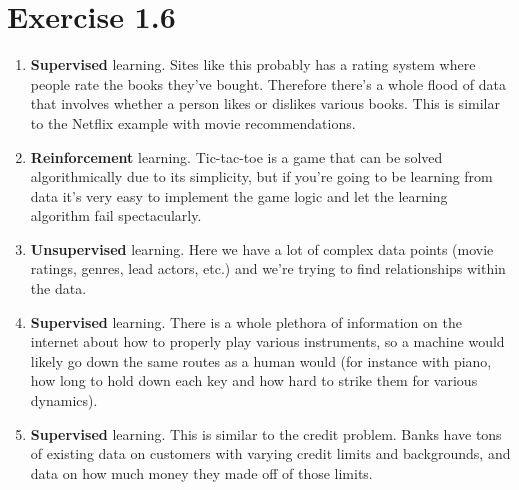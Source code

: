 \documentclass[12pt]{article}
\begin{document}
\section*{Exercise 1.6}
\begin{enumerate}[label=(\alph*)]
	\item \textbf{Supervised} learning. Sites like this probably has a rating system where people rate the books they've bought. Therefore there's a whole flood of data that involves whether a person likes or dislikes various books. This is similar to the Netflix example with movie recommendations.
	\item \textbf{Reinforcement} learning. Tic-tac-toe is a game that can be solved algorithmically due to its simplicity, but if you're going to be learning from data it's very easy to implement the game logic and let the learning algorithm fail spectacularly.
	\item \textbf{Unsupervised} learning. Here we have a lot of complex data points (movie ratings, genres, lead actors, etc.) and we're trying to find relationships within the data.
	\item \textbf{Supervised} learning. There is a whole plethora of information on the internet about how to properly play various instruments, so a machine would likely go down the same routes as a human would (for instance with piano, how long to hold down each key and how hard to strike them for various dynamics).
	\item \textbf{Supervised} learning. This is similar to the credit problem. Banks have tons of existing data on customers with varying credit limits and backgrounds, and data on how much money they made off of those limits.
\end{enumerate}
\end{document}
